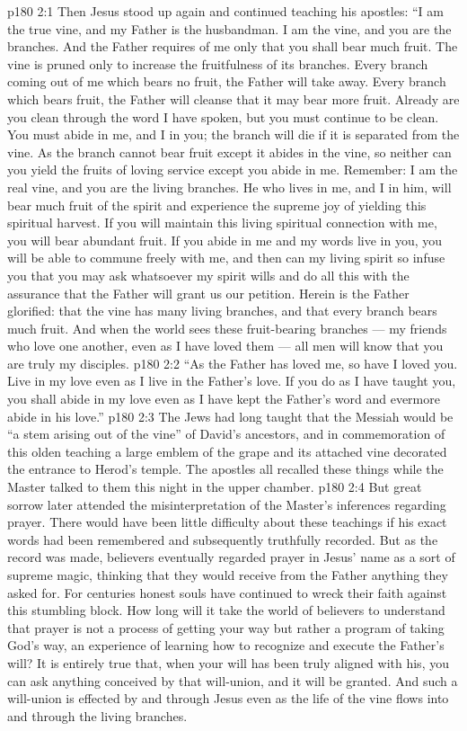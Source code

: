 \vs p180 2:1 Then Jesus stood up again and continued teaching his apostles: \textcolor{ubdarkred}{“I am the true vine, and my Father is the husbandman. I am the vine, and you are the branches. And the Father requires of me only that you shall bear much fruit. The vine is pruned only to increase the fruitfulness of its branches. Every branch coming out of me which bears no fruit, the Father will take away. Every branch which bears fruit, the Father will cleanse that it may bear more fruit. Already are you clean through the word I have spoken, but you must continue to be clean. You must abide in me, and I in you; the branch will die if it is separated from the vine. As the branch cannot bear fruit except it abides in the vine, so neither can you yield the fruits of loving service except you abide in me. Remember: I am the real vine, and you are the living branches. He who lives in me, and I in him, will bear much fruit of the spirit and experience the supreme joy of yielding this spiritual harvest. If you will maintain this living spiritual connection with me, you will bear abundant fruit. If you abide in me and my words live in you, you will be able to commune freely with me, and then can my living spirit so infuse you that you may ask whatsoever my spirit wills and do all this with the assurance that the Father will grant us our petition. Herein is the Father glorified: that the vine has many living branches, and that every branch bears much fruit. And when the world sees these fruit\hyp{}bearing branches --- my friends who love one another, even as I have loved them --- all men will know that you are truly my disciples.}
\vs p180 2:2 \textcolor{ubdarkred}{“As the Father has loved me, so have I loved you. Live in my love even as I live in the Father’s love. If you do as I have taught you, you shall abide in my love even as I have kept the Father’s word and evermore abide in his love.”}
\vs p180 2:3 The Jews had long taught that the Messiah would be “a stem arising out of the vine” of David’s ancestors, and in commemoration of this olden teaching a large emblem of the grape and its attached vine decorated the entrance to Herod’s temple. The apostles all recalled these things while the Master talked to them this night in the upper chamber.
\vs p180 2:4 But great sorrow later attended the misinterpretation of the Master’s inferences regarding prayer. There would have been little difficulty about these teachings if his exact words had been remembered and subsequently truthfully recorded. But as the record was made, believers eventually regarded prayer in Jesus’ name as a sort of supreme magic, thinking that they would receive from the Father anything they asked for. For centuries honest souls have continued to wreck their faith against this stumbling block. How long will it take the world of believers to understand that prayer is not a process of getting your way but rather a program of taking God’s way, an experience of learning how to recognize and execute the Father’s will? It is entirely true that, when your will has been truly aligned with his, you can ask anything conceived by that will\hyp{}union, and it will be granted. And such a will\hyp{}union is effected by and through Jesus even as the life of the vine flows into and through the living branches.
